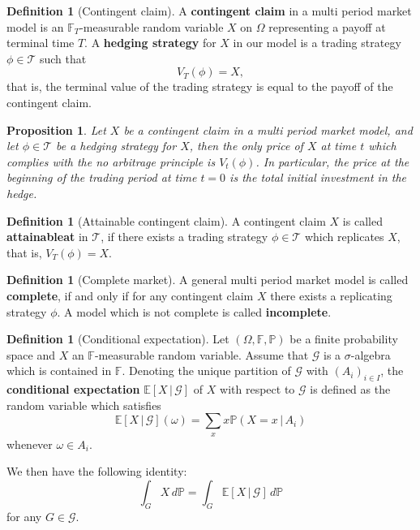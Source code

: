 \documentclass[10pt, oneside, reqno]{amsart}
\theoremstyle{plain}%
\newtheorem{prop}[thm]{Proposition}
\theoremstyle{definition}
\newtheorem{defn}[thm]{Definition}
\theoremstyle{remark}
\newcommand{\expc}[1]{\mathbb{E}\left[#1\right]}
\newcommand{\prob}[1]{\mathbb{P}(#1)}
\newcommand{\given}{ \, | \,}
\newcommand{\F}{\mathbb{F}}
\begin{document}
\begin{defn}[Contingent claim] A \textbf{contingent claim} in a multi period market model is an $\F_T$-measurable random variable $X$ on $\Omega$ representing a payoff at terminal time $T$.  A \textbf{hedging strategy} for $X$ in our model is a trading strategy $\phi \in \mathcal{T}$ such that \[
	V_T(\phi) = X,
\] that is, the terminal value of the trading strategy is equal to the payoff of the contingent claim.
\end{defn}

\begin{prop}Let $X$ be a contingent claim in a multi period market model, and let $\phi \in \mathcal{T}$ be a hedging strategy for $X$, then the only price of $X$ at time $t$ which complies with the no arbitrage principle is $V_t(\phi)$.  In particular, the price at the beginning of the trading period at time $t = 0$ is the total initial investment in the hedge.
\end{prop}

\begin{defn}[Attainable contingent claim] A contingent claim $X$ is called \textbf{attainableat} in $\mathcal{T}$, if there exists a trading strategy $\phi \in \mathcal{T}$ which replicates $X$, that is, $V_T(\phi) = X$.
\end{defn}

\begin{defn}[Complete market] 
	A general multi period market model is called \textbf{complete}, if and only if for any contingent claim $X$ there exists a replicating strategy $\phi$.  A model which is not complete is called \textbf{incomplete}.	
\end{defn}

\begin{defn}[Conditional expectation]
	Let $(\Omega, \F, \mathbb{P})$ be a finite probability space and $X$ an $\F$-measurable random variable.  Assume that $\mathcal{G}$ is a $\sigma$-algebra which is contained in $\F$.  Denoting the unique partition of $\mathcal{G}$ with $(A_i)_{i \in I}$, the \textbf{conditional expectation} $\expc{X \given \mathcal{G}}$ of $X$ with respect to $\mathcal{G}$ is defined as the random variable which satisfies \[
		\expc{X \given \mathcal{G}}(\omega) = \sum_{x} x \prob{X = x \given A_i}
	\] whenever $\omega \in A_i$. 
	
	We then have the following identity: \[
		\int_G X \, d\mathbb{P} = \int_G \expc{X \given \mathcal{G}} \, d \mathbb{P}
	\] for any $G \in \mathcal{G}$.
\end{defn}
\end{document}
